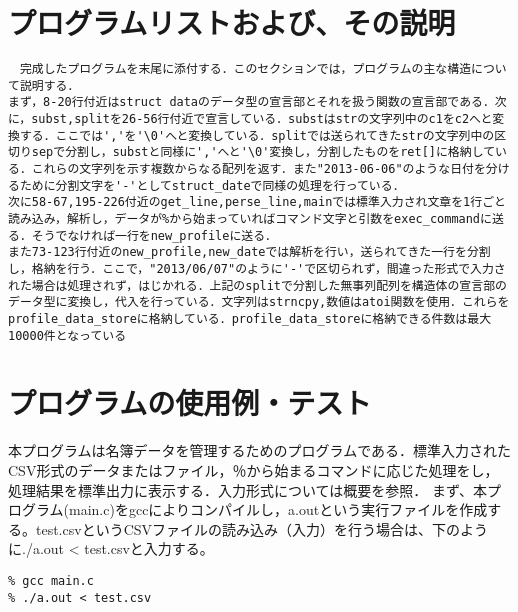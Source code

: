 \documentclass[a4j]{jarticle}
\begin{document}
%
%

\section{プログラムリストおよび、その説明}

\begin{verbatim}
　完成したプログラムを末尾に添付する．このセクションでは，プログラムの主な構造について説明する．
まず，8-20行付近はstruct dataのデータ型の宣言部とそれを扱う関数の宣言部である．次に，subst,splitを26-56行付近で宣言している．substはstrの文字列中のc1をc2へと変換する．ここでは','を'\0'へと変換している．splitでは送られてきたstrの文字列中の区切りsepで分割し，substと同様に','へと'\0'変換し，分割したものをret[]に格納している．これらの文字列を示す複数からなる配列を返す．また"2013-06-06"のような日付を分けるために分割文字を'-'としてstruct_dateで同様の処理を行っている．
次に58-67,195-226付近のget_line,perse_line,mainでは標準入力され文章を1行ごと読み込み，解析し，データが%から始まっていればコマンド文字と引数をexec_commandに送る．そうでなければ一行をnew_profileに送る．
また73-123行付近のnew_profile,new_dateでは解析を行い，送られてきた一行を分割し，格納を行う．ここで，"2013/06/07"のように'-'で区切られず，間違った形式で入力された場合は処理されず，はじかれる．上記のsplitで分割した無事列配列を構造体の宣言部のデータ型に変換し，代入を行っている．文字列はstrncpy,数値はatoi関数を使用．これらをprofile_data_storeに格納している．profile_data_storeに格納できる件数は最大10000件となっている

\end{verbatim}

%
%

\section{プログラムの使用例・テスト}

本プログラムは名簿データを管理するためのプログラムである．標準入力されたCSV形式のデータまたはファイル，％から始まるコマンドに応じた処理をし，処理結果を標準出力に表示する．入力形式については概要を参照．
まず、本プログラム(main.c)をgccによりコンパイルし，a.outという実行ファイルを作成する。test.csvというCSVファイルの読み込み（入力）を行う場合は、下のように./a.out < test.csvと入力する。

{\baselineskip 3mm
\begin{verbatim}
% gcc main.c
% ./a.out < test.csv
\end{verbatim}
}
\end{document}
